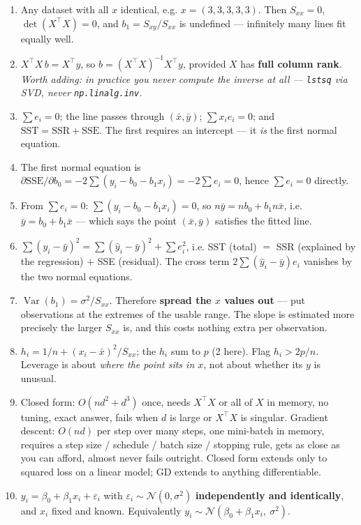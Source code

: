 \documentclass[11pt,a4paper]{article}
\newcommand{\A}[1]{\item[\textbf{#1}]}
\begin{document}
\begin{enumerate}[leftmargin=1.9cm]
\A{U5.9} Any dataset with all $x$ identical, e.g. $x = (3,3,3,3,3)$. Then
$S_{xx} = 0$, $\det(X^\top X) = 0$, and $b_1 = S_{xy}/S_{xx}$ is undefined ---
infinitely many lines fit equally well.

\A{U5.10} $X^\top X\, b = X^\top y$, so $b = (X^\top X)^{-1}X^\top y$, provided
$X$ has \textbf{full column rank}.
\emph{Worth adding: in practice you never compute the inverse at all --- \texttt{lstsq} via SVD, never \texttt{np.linalg.inv}.}

\A{U5.11} $\sum e_i = 0$; the line passes through $(\bar x, \bar y)$;
$\sum x_i e_i = 0$; and $\text{SST} = \text{SSR} + \text{SSE}$. The first
requires an intercept --- it \emph{is} the first normal equation.

\A{U5.12} The first normal equation is
$\partial\text{SSE}/\partial b_0 = -2\sum(y_i - b_0 - b_1x_i) = -2\sum e_i = 0$,
hence $\sum e_i = 0$ directly.

\A{U5.13} From $\sum e_i = 0$: $\sum(y_i - b_0 - b_1x_i) = 0$, so
$n\bar y = nb_0 + b_1 n\bar x$, i.e. $\bar y = b_0 + b_1\bar x$ --- which says
the point $(\bar x, \bar y)$ satisfies the fitted line.

\A{U5.14} $\sum(y_i-\bar y)^2 = \sum(\hat y_i-\bar y)^2 + \sum e_i^2$, i.e.
SST (total) $=$ SSR (explained by the regression) $+$ SSE (residual). The
cross term $2\sum(\hat y_i - \bar y)e_i$ vanishes by the two normal equations.

\A{U5.15} $\operatorname{Var}(b_1) = \sigma^2/S_{xx}$. Therefore
\textbf{spread the $x$ values out} --- put observations at the extremes of the
usable range. The slope is estimated more precisely the larger $S_{xx}$ is, and
this costs nothing extra per observation.

\A{U5.16} $h_i = 1/n + (x_i-\bar x)^2/S_{xx}$; the $h_i$ sum to $p$ (2 here).
Flag $h_i > 2p/n$. Leverage is about \emph{where the point sits in $x$}, not
about whether its $y$ is unusual.

\A{U5.17} Closed form: $O(nd^2 + d^3)$ once, needs $X^\top X$ or all of $X$ in
memory, no tuning, exact answer, fails when $d$ is large or $X^\top X$ is
singular. Gradient descent: $O(nd)$ per step over many steps, one mini-batch in
memory, requires a step size / schedule / batch size / stopping rule, gets as
close as you can afford, almost never fails outright. Closed form extends only
to squared loss on a linear model; GD extends to anything differentiable.

\A{U5.18} $y_i = \beta_0 + \beta_1x_i + \varepsilon_i$ with
$\varepsilon_i \sim \mathcal N(0,\sigma^2)$ \textbf{independently and
identically}, and $x_i$ fixed and known. Equivalently
$y_i \sim \mathcal N(\beta_0 + \beta_1x_i,\ \sigma^2)$.


\end{enumerate}
\end{document}
